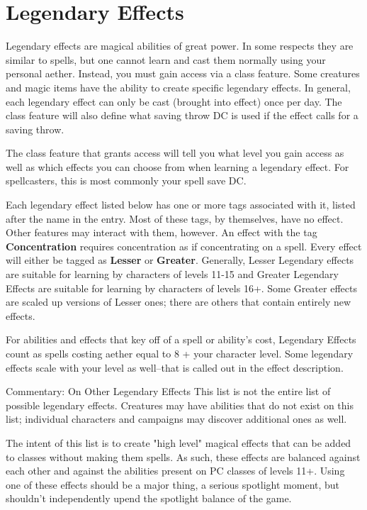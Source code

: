 \section{Legendary Effects}
\label{sec:legendary-effects}
Legendary effects are magical abilities of great power. In some respects they are similar to spells, but one cannot learn and cast them normally using your personal aether. Instead, you must gain access via a class feature. Some creatures and magic items have the ability to create specific legendary effects. In general, each legendary effect can only be cast (brought into effect) once per day. The class feature will also define what saving throw DC is used if the effect calls for a saving throw.

The class feature that grants access will tell you what level you gain access as well as which effects you can choose from when learning a legendary effect.  For spellcasters, this is most commonly your spell save DC.

Each legendary effect listed below has one or more tags associated with it, listed after the name in the entry. Most of these tags, by themselves, have no effect. Other features may interact with them, however. An effect with the tag \textbf{Concentration} requires concentration as if concentrating on a spell. Every effect will either be tagged as \textbf{Lesser} or \textbf{Greater}. Generally, Lesser Legendary effects are suitable for learning by characters of levels 11-15 and Greater Legendary Effects are suitable for learning by characters of levels 16+. Some Greater effects are scaled up versions of Lesser ones; there are others that contain entirely new effects.

For abilities and effects that key off of a spell or ability's cost, Legendary Effects count as spells costing aether equal to 8 + your character level. Some legendary effects scale with your level as well--that is called out in the effect description.

\begin{DndComment}{Commentary: On Other Legendary Effects}
	This list is not the entire list of possible legendary effects. Creatures may have abilities that do not exist on this list; individual characters and campaigns may discover additional ones as well.

	The intent of this list is to create "high level" magical effects that can be added to classes without making them spells. As such, these effects are balanced against each other and against the abilities present on PC classes of levels 11+. Using one of these effects should be a major thing, a serious spotlight moment, but shouldn't independently upend the spotlight balance of the game.
\end{DndComment}

